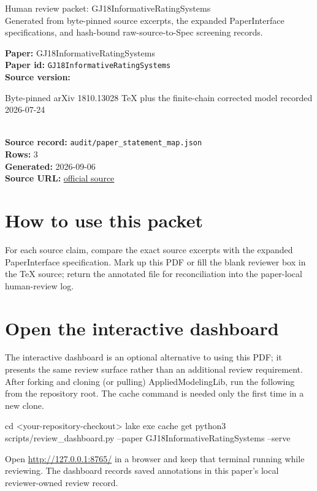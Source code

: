 \documentclass[10pt]{article}
\begin{document}
\fontsize{9}{10}\selectfont

\begin{center}
{\LARGE Human review packet: GJ18InformativeRatingSystems}\\[0.35em]
\small Generated from byte-pinned source excerpts, the expanded PaperInterface
specifications, and hash-bound raw-source-to-Spec screening records.
\end{center}

\noindent\textbf{Paper:} GJ18InformativeRatingSystems\\
\textbf{Paper id:} \texttt{GJ18InformativeRatingSystems}\\
\textbf{Source version:} \parbox[t]{0.76\linewidth}{\raggedright Byte-pinned arXiv 1810.13028 TeX plus the finite-chain corrected model recorded 2026-07-24}\\
\textbf{Source record:} \texttt{audit/paper\_statement\_map.json}\\
\textbf{Rows:} 3\\
\textbf{Generated:} 2026-09-06\\
\textbf{Source URL:} \href{https://arxiv.org/pdf/1810.13028}{official source}





\section*{How to use this packet}
For each source claim, compare the exact source excerpts with the expanded
PaperInterface specification. Mark up this PDF or fill the blank reviewer box in the TeX source;
return the annotated file for reconciliation into the paper-local human-review
log.

\section*{Open the interactive dashboard}
The interactive dashboard is an optional alternative to using this PDF; it
presents the same review surface rather than an additional review requirement.
After forking and cloning (or pulling) AppliedModelingLib, run the following from the
repository root. The cache command is needed only the first time in a new clone.
\begin{ReviewVerbatim}
cd <your-repository-checkout>
lake exe cache get
python3 scripts/review_dashboard.py --paper GJ18InformativeRatingSystems --serve
\end{ReviewVerbatim}
Open \url{http://127.0.0.1:8765/} in a browser and keep that terminal running
while reviewing. The dashboard records saved annotations in this paper's local
reviewer-owned review record.
\end{document}
